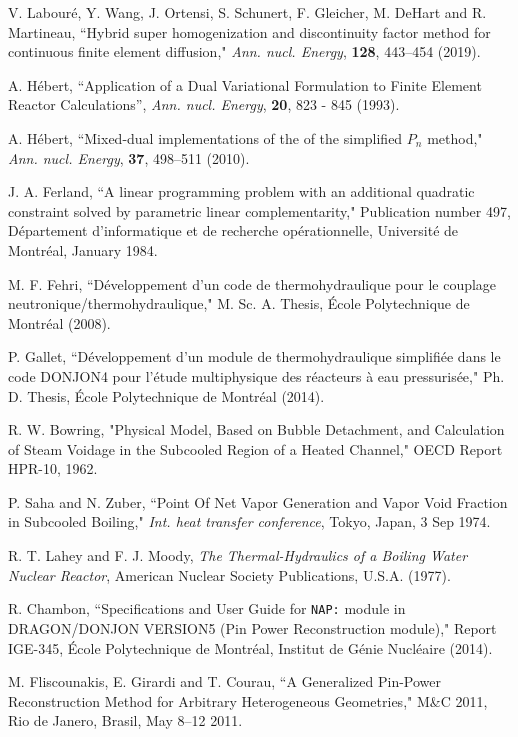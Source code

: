 \begin{thebibliography}{99}
V. Labour\'e, Y. Wang, J. Ortensi, S. Schunert, F. Gleicher, M. DeHart and R. Martineau, ``Hybrid super homogenization and discontinuity factor method for continuous finite element diffusion," {\sl Ann. nucl. Energy}, {\bf 128}, 443--454 (2019).

A. H\'ebert, ``Application of a Dual Variational Formulation to Finite Element Reactor Calculations'', {\sl Ann. nucl. Energy}, {\bf 20}, 823 - 845 (1993).

A. H\'ebert, ``Mixed-dual implementations of the of the simplified $P_n$ method," {\sl Ann. nucl. Energy}, {\bf 37}, 498--511 (2010).

J. A. Ferland, ``A linear programming problem with an additional
quadratic constraint solved by parametric linear complementarity,"
Publication number 497, D\'epartement d'informatique et de recherche
op\'erationnelle, Universit\'e de Montr\'eal, January 1984.

 M. F. Fehri, ``D\'eveloppement d'un code de thermohydraulique pour le couplage neutro\-nique/thermohydraulique,"
M. Sc. A. Thesis, \'Ecole Polytechnique de Montr\'eal (2008).

 P. Gallet, ``D\'eveloppement d'un module de thermohydraulique simplifi\'ee dans le code DONJON4 pour l'\'etude multiphysique
des r\'eacteurs \`a eau pressuris\'ee," Ph. D. Thesis, \'Ecole Polytechnique de Montr\'eal (2014).

R. W. Bowring, "Physical Model, Based on Bubble Detachment, and Calculation of Steam Voidage in the Subcooled
Region of a Heated Channel," OECD Report HPR-10, 1962.

P. Saha and N. Zuber, ``Point Of Net Vapor Generation and Vapor Void Fraction in Subcooled Boiling," {\sl Int. heat transfer conference}, Tokyo, Japan, 3 Sep 1974.

R. T. Lahey and F. J. Moody, {\sl The Thermal-Hydraulics of a Boiling Water Nuclear Reactor},
American Nuclear Society Publications, U.S.A. (1977).

R. Chambon, ``Specifications and User Guide for {\tt NAP:} module in DRAGON/DONJON VERSION5
(Pin Power Reconstruction module)," Report IGE-345,
\'Ecole Polytechnique de Montr\'eal,
 Institut de G\'enie Nucl\'eaire (2014).

M. Fliscounakis, E. Girardi and T. Courau, ``A Generalized Pin-Power Reconstruction Method for
Arbitrary Heterogeneous Geometries," M\&C 2011, Rio de Janero, Brasil, May 8--12 2011.


\end{thebibliography}
